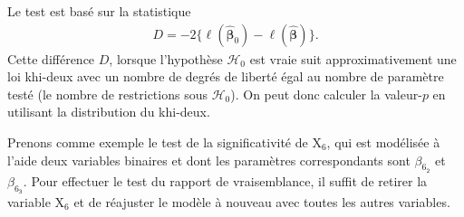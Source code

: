 \documentclass[
  11pt,
  letterpaper,
]{scrbook}
\newenvironment{Shaded}{\begin{snugshade}}{\end{snugshade}}
\newcommand{\AttributeTok}[1]{\textcolor[rgb]{0.40,0.45,0.13}{#1}}
\newcommand{\CommentTok}[1]{\textcolor[rgb]{0.37,0.37,0.37}{#1}}
\newcommand{\ConstantTok}[1]{\textcolor[rgb]{0.56,0.35,0.01}{#1}}
\newcommand{\DecValTok}[1]{\textcolor[rgb]{0.68,0.00,0.00}{#1}}
\newcommand{\DocumentationTok}[1]{\textcolor[rgb]{0.37,0.37,0.37}{\textit{#1}}}
\newcommand{\FunctionTok}[1]{\textcolor[rgb]{0.28,0.35,0.67}{#1}}
\newcommand{\NormalTok}[1]{\textcolor[rgb]{0.00,0.23,0.31}{#1}}
\newcommand{\OtherTok}[1]{\textcolor[rgb]{0.00,0.23,0.31}{#1}}
\newcommand{\SpecialCharTok}[1]{\textcolor[rgb]{0.37,0.37,0.37}{#1}}
\newcommand{\StringTok}[1]{\textcolor[rgb]{0.13,0.47,0.30}{#1}}
\theoremstyle{definition}
\theoremstyle{remark}
\begin{document}
Le test est basé sur la statistique \begin{align*}
 D = -2\{\ell(\widehat{\boldsymbol{\beta}}_0)-\ell(\widehat{\boldsymbol{\beta}})\}.
\end{align*} Cette différence \(D\), lorsque l'hypothèse
\(\mathscr{H}_0\) est vraie suit approximativement une loi khi-deux avec
un nombre de degrés de liberté égal au nombre de paramètre testé (le
nombre de restrictions sous \(\mathscr{H}_0\)). On peut donc calculer la
valeur-\(p\) en utilisant la distribution du khi-deux.

Prenons comme exemple le test de la significativité de \(\mathrm{X}_6\),
qui est modélisée à l'aide deux variables binaires et dont les
paramètres correspondants sont \(\beta_{6_{\texttt{2}}}\) et
\(\beta_{6_{\texttt{3}}}\). Pour effectuer le test du rapport de
vraisemblance, il suffit de retirer la variable \(\mathrm{X}_6\) et de
réajuster le modèle à nouveau avec toutes les autres variables.

\begin{Shaded}
\end{Shaded}
\end{document}
